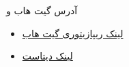\Section
{آدرس گیت هاب و }
{
	\begin{itemize}
		\item 
		\href{https://github.com/Emadmousavi/stock\_tweets\_sentiment\_analysis}{لینک ریپازیتوری گیت هاب}
		
		\item \href{https://huggingface.co/datasets/emad12/stock_tweets_sentiment/viewer/emad12--stock_tweets_sentiment}{لینک دیتاست }
	\end{itemize}
}